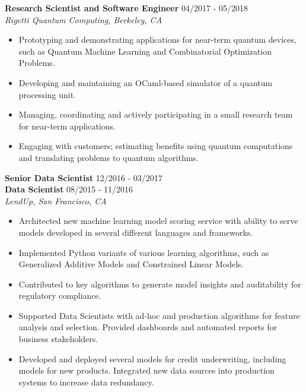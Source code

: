 \documentclass[10pt,centered]{./res} %
\begin{document}
\begin{resume}
{\bf Research Scientist and Software Engineer} \hfill04/2017 - 05/2018 \\
{\it Rigetti Quantum Computing, Berkeley, CA}
\begin{itemize}
  \item Prototyping and demonstrating applications for near-term quantum devices, such as Quantum Machine Learning and Combinatorial Optimization Problems.
  \item Developing and maintaining an OCaml-based simulator of a quantum processing unit.
  \item Managing, coordinating and actively participating in a small research team for near-term applications.
  \item Engaging with customers; estimating benefits using quantum computations and translating problems to quantum algorithms.
\end{itemize}

{\bf Senior Data Scientist} \hfill12/2016 - 03/2017 \\
{\bf Data Scientist} \hfill08/2015 - 11/2016 \\
{\it LendUp, San Francisco, CA}
\begin{itemize}
  \item Architected new machine learning model scoring service with ability to serve models developed in several different languages and frameworks.
  \item Implemented Python variants of various learning algorithms, such as Generalized Additive Models and Constrained Linear Models.
  \item Contributed to key algorithms to generate model insights and auditability for regulatory compliance.
  \item Supported Data Scientists with ad-hoc and production algorithms for feature analysis and selection. Provided dashboards and automated reports for business stakeholders.
  \item Developed and deployed several models for credit underwriting, including models for new products. Integrated new data sources into production systems to increase data redundancy.
\end{itemize}

\newpage


\end{resume}
\end{document}
